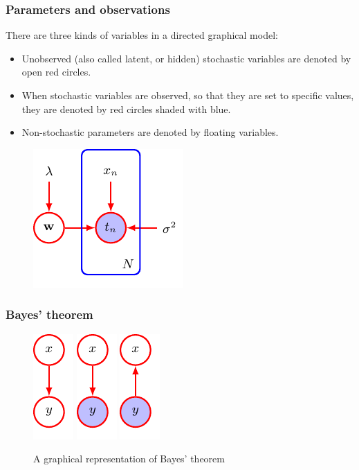 \documentclass{beamer}
\begin{document}
\begin{frame}
    \frametitle{Parameters and observations}
    There are three kinds of variables in a directed graphical model:
    \begin{itemize}
        \item Unobserved (also called latent, or hidden) stochastic variables are denoted by open red circles.
        \item When stochastic variables are observed, so that they are set to specific values, they are denoted by red circles shaded with blue.
        \item Non-stochastic parameters are denoted by floating variables.
    \end{itemize}
    \begin{figure}
        \includegraphics{Figure_11.pdf}
    \end{figure}
\end{frame}

\begin{frame}
    \frametitle{Bayes' theorem}
    \begin{figure}
        \caption{A graphical representation of Bayes' theorem}
        \includegraphics[trim=0 0 -1cm 0]{Figure_13_a.pdf}
        \includegraphics[trim=-1cm 0 -1cm 0]{Figure_13_b.pdf}
        \includegraphics[trim=-1cm 0 0 0]{Figure_13_c.pdf}
    \end{figure}
\end{frame}
\end{document}
